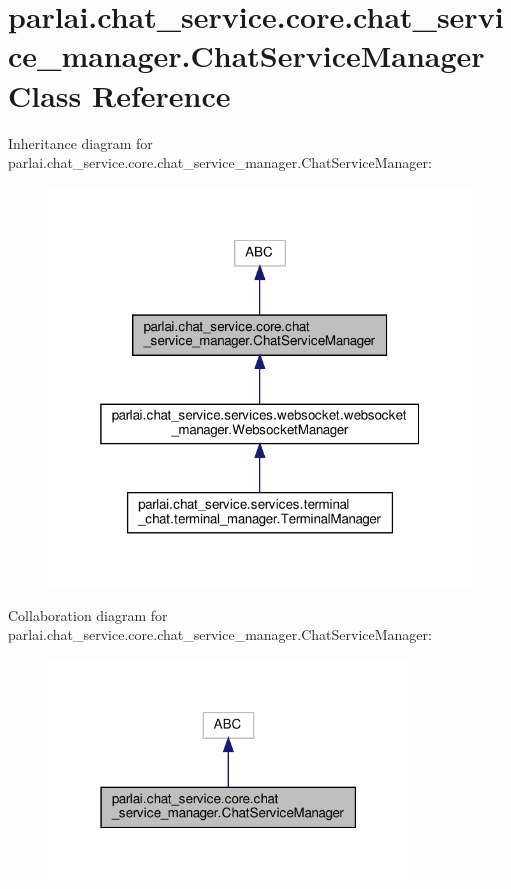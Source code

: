 \hypertarget{classparlai_1_1chat__service_1_1core_1_1chat__service__manager_1_1ChatServiceManager}{}\section{parlai.\+chat\+\_\+service.\+core.\+chat\+\_\+service\+\_\+manager.\+Chat\+Service\+Manager Class Reference}
\label{classparlai_1_1chat__service_1_1core_1_1chat__service__manager_1_1ChatServiceManager}


Inheritance diagram for parlai.\+chat\+\_\+service.\+core.\+chat\+\_\+service\+\_\+manager.\+Chat\+Service\+Manager\+:
\nopagebreak
\begin{figure}[H]
\begin{center}
\leavevmode
\includegraphics[width=319pt]{d6/d02/classparlai_1_1chat__service_1_1core_1_1chat__service__manager_1_1ChatServiceManager__inherit__graph}
\end{center}
\end{figure}


Collaboration diagram for parlai.\+chat\+\_\+service.\+core.\+chat\+\_\+service\+\_\+manager.\+Chat\+Service\+Manager\+:
\nopagebreak
\begin{figure}[H]
\begin{center}
\leavevmode
\includegraphics[width=271pt]{d4/d29/classparlai_1_1chat__service_1_1core_1_1chat__service__manager_1_1ChatServiceManager__coll__graph}
\end{center}
\end{figure}
